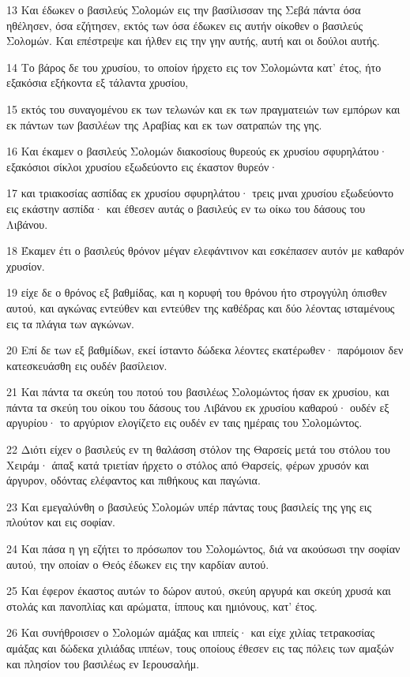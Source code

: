 \par 13 Και έδωκεν ο βασιλεύς Σολομών εις την βασίλισσαν της Σεβά πάντα όσα ηθέλησεν, όσα εζήτησεν, εκτός των όσα έδωκεν εις αυτήν οίκοθεν ο βασιλεύς Σολομών. Και επέστρεψε και ήλθεν εις την γην αυτής, αυτή και οι δούλοι αυτής.
\par 14 Το βάρος δε του χρυσίου, το οποίον ήρχετο εις τον Σολομώντα κατ' έτος, ήτο εξακόσια εξήκοντα εξ τάλαντα χρυσίου,
\par 15 εκτός του συναγομένου εκ των τελωνών και εκ των πραγματειών των εμπόρων και εκ πάντων των βασιλέων της Αραβίας και εκ των σατραπών της γης.
\par 16 Και έκαμεν ο βασιλεύς Σολομών διακοσίους θυρεούς εκ χρυσίου σφυρηλάτου· εξακόσιοι σίκλοι χρυσίου εξωδεύοντο εις έκαστον θυρεόν·
\par 17 και τριακοσίας ασπίδας εκ χρυσίου σφυρηλάτου· τρεις μναι χρυσίου εξωδεύοντο εις εκάστην ασπίδα· και έθεσεν αυτάς ο βασιλεύς εν τω οίκω του δάσους του Λιβάνου.
\par 18 Έκαμεν έτι ο βασιλεύς θρόνον μέγαν ελεφάντινον και εσκέπασεν αυτόν με καθαρόν χρυσίον.
\par 19 είχε δε ο θρόνος εξ βαθμίδας, και η κορυφή του θρόνου ήτο στρογγύλη όπισθεν αυτού, και αγκώνας εντεύθεν και εντεύθεν της καθέδρας και δύο λέοντας ισταμένους εις τα πλάγια των αγκώνων.
\par 20 Επί δε των εξ βαθμίδων, εκεί ίσταντο δώδεκα λέοντες εκατέρωθεν· παρόμοιον δεν κατεσκευάσθη εις ουδέν βασίλειον.
\par 21 Και πάντα τα σκεύη του ποτού του βασιλέως Σολομώντος ήσαν εκ χρυσίου, και πάντα τα σκεύη του οίκου του δάσους του Λιβάνου εκ χρυσίου καθαρού· ουδέν εξ αργυρίου· το αργύριον ελογίζετο εις ουδέν εν ταις ημέραις του Σολομώντος.
\par 22 Διότι είχεν ο βασιλεύς εν τη θαλάσση στόλον της Θαρσείς μετά του στόλου του Χειράμ· άπαξ κατά τριετίαν ήρχετο ο στόλος από Θαρσείς, φέρων χρυσόν και άργυρον, οδόντας ελέφαντος και πιθήκους και παγώνια.
\par 23 Και εμεγαλύνθη ο βασιλεύς Σολομών υπέρ πάντας τους βασιλείς της γης εις πλούτον και εις σοφίαν.
\par 24 Και πάσα η γη εζήτει το πρόσωπον του Σολομώντος, διά να ακούσωσι την σοφίαν αυτού, την οποίαν ο Θεός έδωκεν εις την καρδίαν αυτού.
\par 25 Και έφερον έκαστος αυτών το δώρον αυτού, σκεύη αργυρά και σκεύη χρυσά και στολάς και πανοπλίας και αρώματα, ίππους και ημιόνους, κατ' έτος.
\par 26 Και συνήθροισεν ο Σολομών αμάξας και ιππείς· και είχε χιλίας τετρακοσίας αμάξας και δώδεκα χιλιάδας ιππέων, τους οποίους έθεσεν εις τας πόλεις των αμαξών και πλησίον του βασιλέως εν Ιερουσαλήμ.
